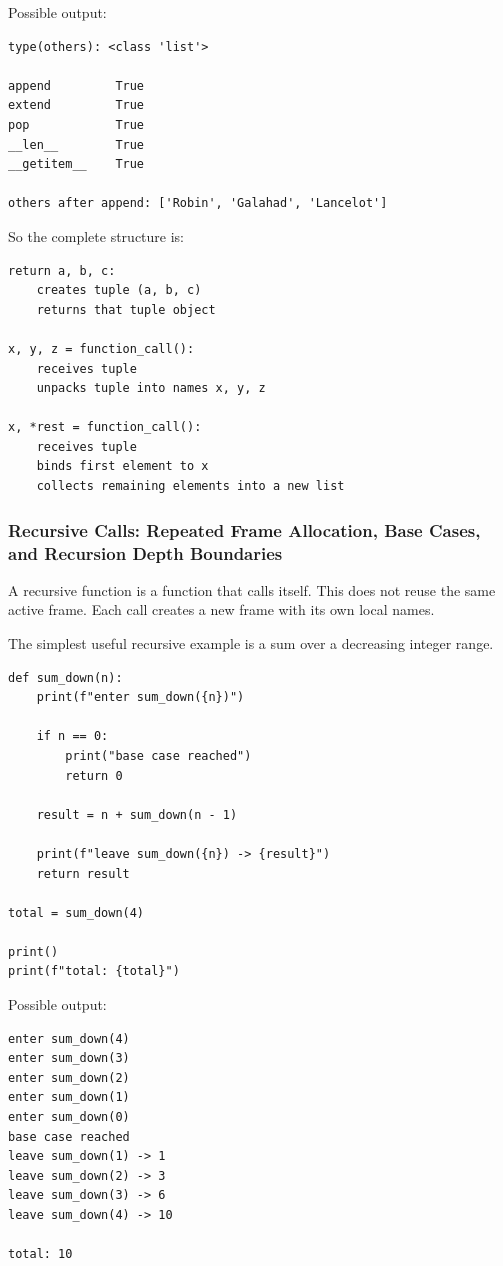 Possible output:

\begin{verbatim}
type(others): <class 'list'>

append         True
extend         True
pop            True
__len__        True
__getitem__    True

others after append: ['Robin', 'Galahad', 'Lancelot']
\end{verbatim}

So the complete structure is:

\begin{verbatim}
return a, b, c:
    creates tuple (a, b, c)
    returns that tuple object

x, y, z = function_call():
    receives tuple
    unpacks tuple into names x, y, z

x, *rest = function_call():
    receives tuple
    binds first element to x
    collects remaining elements into a new list
\end{verbatim}

\subsubsection{Recursive Calls: Repeated Frame Allocation, Base Cases, and Recursion Depth Boundaries}

A recursive function is a function that calls itself. This does not reuse the same active frame. Each call creates a new frame with its own local names.

The simplest useful recursive example is a sum over a decreasing integer range.

\begin{verbatim}
def sum_down(n):
    print(f"enter sum_down({n})")

    if n == 0:
        print("base case reached")
        return 0

    result = n + sum_down(n - 1)

    print(f"leave sum_down({n}) -> {result}")
    return result

total = sum_down(4)

print()
print(f"total: {total}")
\end{verbatim}

Possible output:

\begin{verbatim}
enter sum_down(4)
enter sum_down(3)
enter sum_down(2)
enter sum_down(1)
enter sum_down(0)
base case reached
leave sum_down(1) -> 1
leave sum_down(2) -> 3
leave sum_down(3) -> 6
leave sum_down(4) -> 10

total: 10
\end{verbatim}

